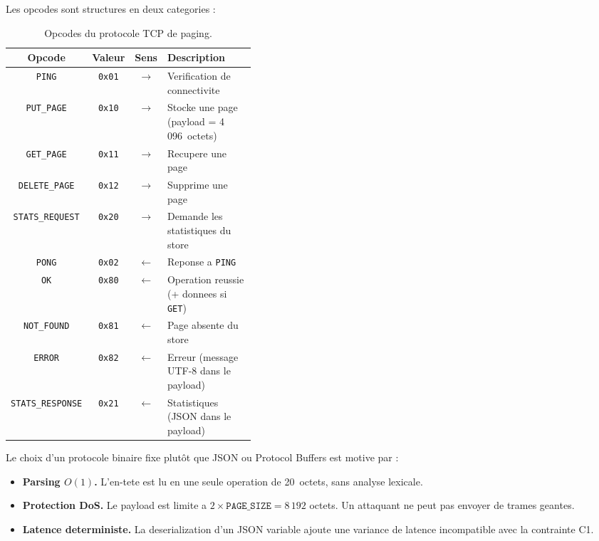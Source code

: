 Les opcodes sont structures en deux categories :

\begin{table}[htbp]
    \centering
    \caption{Opcodes du protocole TCP de paging.}
    \label{tab:opcodes-tcp}
    \begin{tabular}{c c c p{0.40\linewidth}}
        \toprule
        \textbf{Opcode} & \textbf{Valeur} & \textbf{Sens} & \textbf{Description} \\
        \midrule
        \texttt{PING} & \texttt{0x01} & $\to$ & Verification de connectivite \\
        \texttt{PUT\_PAGE} & \texttt{0x10} & $\to$ & Stocke une page (payload = 4\,096~octets) \\
        \texttt{GET\_PAGE} & \texttt{0x11} & $\to$ & Recupere une page \\
        \texttt{DELETE\_PAGE} & \texttt{0x12} & $\to$ & Supprime une page \\
        \texttt{STATS\_REQUEST} & \texttt{0x20} & $\to$ & Demande les statistiques du store \\
        \midrule
        \texttt{PONG} & \texttt{0x02} & $\leftarrow$ & Reponse a \texttt{PING} \\
        \texttt{OK} & \texttt{0x80} & $\leftarrow$ & Operation reussie (+ donnees si \texttt{GET}) \\
        \texttt{NOT\_FOUND} & \texttt{0x81} & $\leftarrow$ & Page absente du store \\
        \texttt{ERROR} & \texttt{0x82} & $\leftarrow$ & Erreur (message UTF-8 dans le payload) \\
        \texttt{STATS\_RESPONSE} & \texttt{0x21} & $\leftarrow$ & Statistiques (JSON dans le payload) \\
        \bottomrule
    \end{tabular}
\end{table}

Le choix d'un protocole binaire fixe plut\^ot que JSON ou Protocol Buffers est motive par :

\begin{itemize}
    \item \textbf{Parsing $O(1)$.} L'en-tete est lu en une seule operation de 20~octets, sans analyse lexicale.
    \item \textbf{Protection DoS.} Le payload est limite a $2 \times \texttt{PAGE\_SIZE} = 8\,192$ octets. Un attaquant ne peut pas envoyer de trames geantes.
    \item \textbf{Latence deterministe.} La deserialization d'un JSON variable ajoute une variance de latence incompatible avec la contrainte C1.
\end{itemize}


